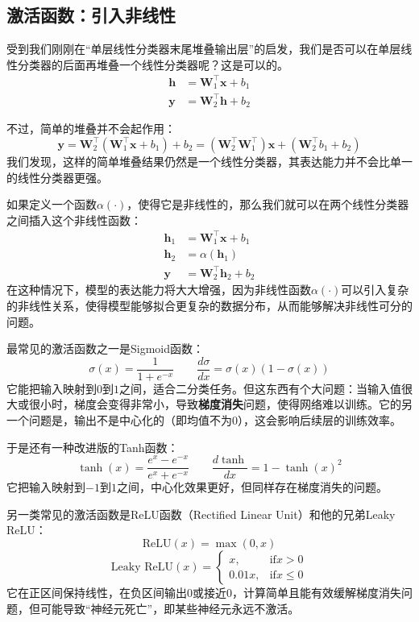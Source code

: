 \subsection{激活函数：引入非线性}

受到我们刚刚在“单层线性分类器末尾堆叠输出层”的启发，我们是否可以在单层线性分类器的后面再堆叠一个线性分类器呢？这是可以的。
\begin{align*}
    \mathbf{h} &= \mathbf{W}_1^\top \mathbf{x} + b_1 \\
    \mathbf{y} &= \mathbf{W}_2^\top \mathbf{h} + b_2
\end{align*}

不过，简单的堆叠并不会起作用：
\[ \mathbf{y} = \mathbf{W}_2^\top (\mathbf{W}_1^\top \mathbf{x} + b_1) + b_2 = (\mathbf{W}_2^\top \mathbf{W}_1^\top) \mathbf{x} + (\mathbf{W}_2^\top b_1 + b_2) \]
我们发现，这样的简单堆叠结果仍然是一个线性分类器，其表达能力并不会比单一的线性分类器更强。

如果定义一个函数$\alpha(\cdot)$，使得它是非线性的，那么我们就可以在两个线性分类器之间插入这个非线性函数：
\begin{align*}
    \mathbf{h}_1 &= \mathbf{W}_1^\top \mathbf{x} + b_1 \\
    \mathbf{h}_2 &= \alpha(\mathbf{h}_1) \\
    \mathbf{y} &= \mathbf{W}_2^\top \mathbf{h}_2 + b_2
\end{align*}
在这种情况下，模型的表达能力将大大增强，因为非线性函数$\alpha(\cdot)$可以引入复杂的非线性关系，使得模型能够拟合更复杂的数据分布，从而能够解决非线性可分的问题。

最常见的激活函数之一是Sigmoid函数：
\[ \sigma(x) = \frac{1}{1 + e^{-x}} \qquad \frac{d\sigma}{dx} = \sigma(x)(1 - \sigma(x)) \]
它能把输入映射到$0$到$1$之间，适合二分类任务。但这东西有个大问题：当输入值很大或很小时，梯度会变得非常小，导致\textbf{梯度消失}问题，使得网络难以训练。它的另一个问题是，输出不是中心化的（即均值不为0），这会影响后续层的训练效率。

于是还有一种改进版的Tanh函数：
\[ \tanh(x) = \frac{e^{x} - e^{-x}}{e^{x} + e^{-x}} \qquad \frac{d\tanh}{dx} = 1 - \tanh(x)^2\]
它把输入映射到$-1$到$1$之间，中心化效果更好，但同样存在梯度消失的问题。

另一类常见的激活函数是ReLU函数（Rectified Linear Unit）和他的兄弟Leaky ReLU：
\[ \text{ReLU}(x) = \max(0, x) \]
\[ \text{Leaky ReLU}(x) =
    \begin{cases} x, & \text{if} x > 0 \\ 0.01x, & \text{if} x \leq 0
\end{cases} \]
它在正区间保持线性，在负区间输出0或接近0，计算简单且能有效缓解梯度消失问题，但可能导致“神经元死亡”，即某些神经元永远不激活。

